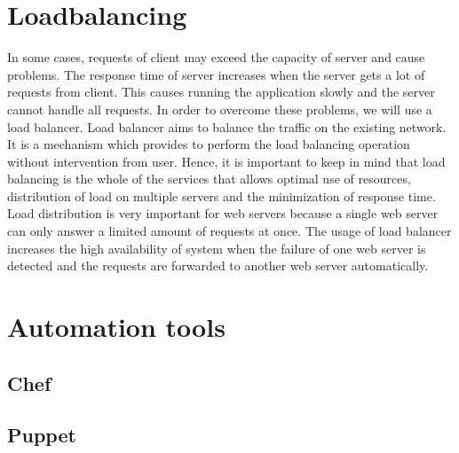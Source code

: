 \section{Loadbalancing}
In some cases, requests of client may exceed the capacity of server and cause problems.  The response time of server increases when the server gets a lot of requests from client.  This causes running the application slowly and the server cannot handle all requests. In order to overcome these problems, we will use a load balancer. Load balancer aims to balance the traffic on the existing network. It is a mechanism which provides to perform the load balancing operation without intervention from user. Hence, it is important to keep in mind that load balancing is the whole of the services that allows optimal use of resources, distribution of load on multiple servers and the minimization of response time. Load distribution is very important for web servers because a single web server can only answer a limited amount of requests at once. The usage of load balancer increases the high availability of system when the failure of one web server is detected and the requests are forwarded to another web server automatically. 




\section{Automation tools}
\subsection{Chef}
\subsection{Puppet}






